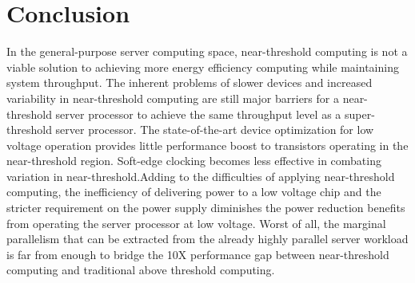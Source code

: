 \section{Conclusion}
\label{sec:conclusion}

In the general-purpose server computing space, near-threshold computing is not a viable solution to achieving more energy efficiency computing while maintaining system throughput.
The inherent problems of slower devices and increased variability in near-threshold computing are still major barriers for a near-threshold server processor to achieve the same throughput level as a super-threshold server processor.
The state-of-the-art device optimization for low voltage operation provides little performance boost to transistors operating in the near-threshold region.
Soft-edge clocking becomes less effective in combating variation in near-threshold.Adding to the difficulties of applying near-threshold computing, the inefficiency of delivering power to a low voltage chip and the stricter requirement on the power supply diminishes the power reduction benefits from operating the server processor at low voltage.
Worst of all, the marginal parallelism that can be extracted from the already highly parallel server workload is far from enough to bridge the 10X performance gap between near-threshold computing and traditional above threshold computing.
